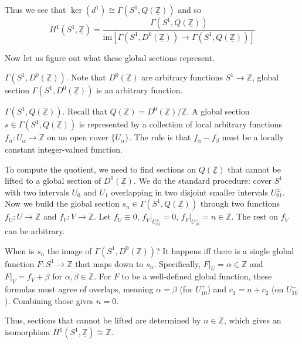 \documentclass{template}
\begin{document}
Thus we see that $\ker(d^1) \cong \Gamma(S^1, Q(\underline{\mathbb{Z}}))$ and so
\begin{equation*}
    H^1(S^1, \underline{\mathbb{Z}}) = \frac{\Gamma(S^1, Q(\underline{\mathbb{Z}}))}{\text{im}[\Gamma(S^1, D^0(\underline{\mathbb{Z}})) \to \Gamma(S^1, Q(\underline{\mathbb{Z}}))]}
\end{equation*}

Now let us figure out what these global sections represent. 

\textcolor{blue!70!black}{$\Gamma(S^1, D^0(\underline{\mathbb{Z}}))$.} Note that
$D^0(\underline{\mathbb{Z}})$ are arbitrary functions $S^1 \to \mathbb{Z}$,
global section $\Gamma(S^1, D^0(\underline{\mathbb{Z}}))$ is an arbitrary
function. 

\textcolor{blue!70!black}{$\Gamma(S^1, Q(\underline{\mathbb{Z}}))$.} Recall 
that $Q(\underline{\mathbb{Z}}) = D^0(\underline{\mathbb{Z}})/\underline{\mathbb{Z}}$.
A global section $s \in \Gamma(S^1, Q(\underline{\mathbb{Z}}))$ is represented 
by a collection of local arbitrary functions $f_{\alpha}: U_{\alpha} \to \mathbb{Z}$ on an 
open cover $\{U_{\alpha}\}$. The rule is that $f_{\alpha}-f_{\beta}$ must be a 
locally constant integer-valued function.

To compute the quotient, we need to find sections on $Q(\underline{\mathbb{Z}})$
that cannot be lifted to a global section of $D^0(\underline{\mathbb{Z}})$. We
do the standard procedure: cover $S^1$ with two intervals $U_0$ and $U_1$
overlapping in two disjoint smaller intervals $U_{01}^{\pm}$. Now we build the
global section $s_n \in \Gamma(S^1, Q(\underline{\mathbb{Z}}))$ through two
functions $f_U: U \to \mathbb{Z}$ and $f_V: V \to \mathbb{Z}$. Let $f_U \equiv
0$, $f_V|_{U_{01}^+}=0$, $f_V|_{U_{10}^-}=n \in \mathbb{Z}$. The rest on
$f_V$ can be arbitrary.

When is $s_n$ the image of $\Gamma(S^1, D^0(\underline{\mathbb{Z}}))$?
It happens iff there is a single global function $F: S^1 \to \mathbb{Z}$ that maps down to $s_n$.
Specifically, $F|_{U}=\alpha \in \mathbb{Z}$ and $F|_{V} = f_V + \beta$ for $\alpha,\beta \in \mathbb{Z}$.
For $F$ to be a well-defined global function, these formulas must agree of overlaps, meaning $\alpha=\beta$ (for $U_{10}^+$)
and $c_1=n+c_2$ (on $U_{10}^-$). Combining those gives $n=0$.

Thus, sections that cannot be lifted are determined by $n \in \mathbb{Z}$, 
which gives an isomorphism $H^1(S^1,\underline{\mathbb{Z}}) \cong \mathbb{Z}$.
\end{document}
